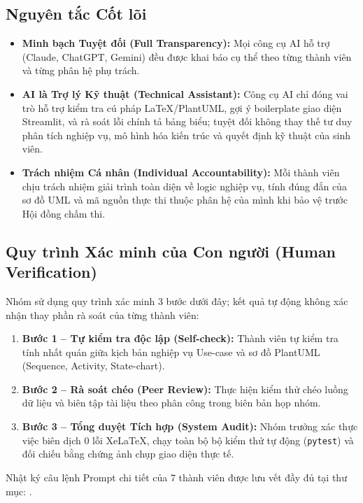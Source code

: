 \documentclass[12pt,a4paper]{article}
\begin{document}
\subsection{Nguyên tắc Cốt lõi}
\begin{itemize}[nosep]
    \item \textbf{Minh bạch Tuyệt đối (Full Transparency):} Mọi công cụ AI hỗ trợ (Claude, ChatGPT, Gemini) đều được khai báo cụ thể theo từng thành viên và từng phân hệ phụ trách.
    \item \textbf{AI là Trợ lý Kỹ thuật (Technical Assistant):} Công cụ AI chỉ đóng vai trò hỗ trợ kiểm tra cú pháp LaTeX/PlantUML, gợi ý boilerplate giao diện Streamlit, và rà soát lỗi chính tả bảng biểu; tuyệt đối không thay thế tư duy phân tích nghiệp vụ, mô hình hóa kiến trúc và quyết định kỹ thuật của sinh viên.
    \item \textbf{Trách nhiệm Cá nhân (Individual Accountability):} Mỗi thành viên chịu trách nhiệm giải trình toàn diện về logic nghiệp vụ, tính đúng đắn của sơ đồ UML và mã nguồn thực thi thuộc phân hệ của mình khi bảo vệ trước Hội đồng chấm thi.
\end{itemize}

\subsection{Quy trình Xác minh của Con người (Human Verification)}
Nhóm sử dụng quy trình xác minh 3 bước dưới đây; kết quả tự động không xác nhận thay phần rà soát của từng thành viên:
\begin{enumerate}[nosep]
    \item \textbf{Bước 1 -- Tự kiểm tra độc lập (Self-check):} Thành viên tự kiểm tra tính nhất quán giữa kịch bản nghiệp vụ Use-case và sơ đồ PlantUML (Sequence, Activity, State-chart).
    \item \textbf{Bước 2 -- Rà soát chéo (Peer Review):} Thực hiện kiểm thử chéo luồng dữ liệu và biên tập tài liệu theo phân công trong biên bản họp nhóm.
    \item \textbf{Bước 3 -- Tổng duyệt Tích hợp (System Audit):} Nhóm trưởng xác thực việc biên dịch 0 lỗi XeLaTeX, chạy toàn bộ bộ kiểm thử tự động (\texttt{pytest}) và đối chiếu bằng chứng ảnh chụp giao diện thực tế.
\end{enumerate}

Nhật ký câu lệnh Prompt chi tiết của 7 thành viên được lưu vết đầy đủ tại thư mục: .
\end{document}
